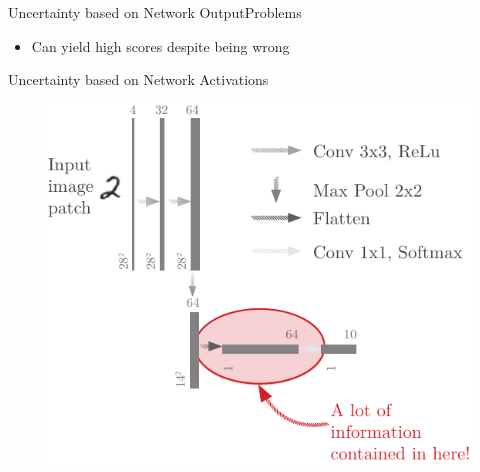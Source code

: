 \documentclass{beamer}
\DeclareMathOperator{\argmax}{argmax}
\begin{document}
\begin{frame}{Uncertainty based on Network Output}{Problems}
\begin{itemize}
\begin{figure}[H]
\begin{subfigure}{.1\textwidth}
		\end{subfigure} $\Rightarrow$ dog
	\end{figure}
	\item Can yield high scores despite being wrong
\end{itemize}
\end{frame}

\begin{frame}{Uncertainty based on Network Activations}
\begin{figure}[H]
	\includegraphics[width=.7\textwidth]{mnist_2}
\end{figure}
\end{frame}

%	
\end{document}
